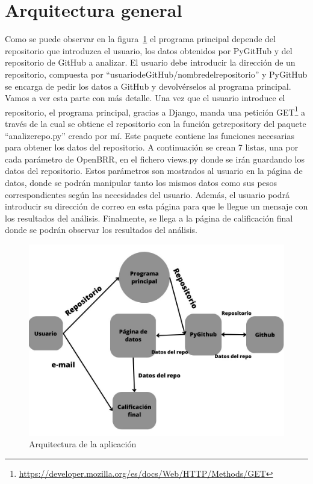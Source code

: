 \documentclass[a4paper, 12pt]{book}
\begin{document}
\section{Arquitectura general} 
\label{sec:arquitectura}
Como se puede observar en la figura~\ref{fig:arquitectura principal} el programa principal depende del repositorio que introduzca el usuario, los datos obtenidos por PyGitHub y del repositorio de GitHub a analizar. El usuario debe introducir la dirección de un repositorio, compuesta por ``usuario\textunderscore de\textunderscore GitHub/nombre\textunderscore del\textunderscore repositorio'' y PyGitHub se encarga de pedir los datos a GitHub y devolvérselos al programa principal. Vamos a ver esta parte con más detalle.
Una vez que el usuario introduce el repositorio, el programa principal, gracias a Django, manda una petición GET\footnote{\url{https://developer.mozilla.org/es/docs/Web/HTTP/Methods/GET}}  a través de la cual se obtiene el repositorio con la función get\textunderscore repository del paquete ``analize\textunderscore repo.py'' creado por mí. Este paquete contiene las funciones necesarias para obtener los datos del repositorio. A continuación se crean 7 listas, una por cada parámetro de OpenBRR, en el fichero views.py donde se irán guardando los datos del repositorio.
Estos parámetros son mostrados al usuario en la página de datos, donde se podrán manipular tanto los mismos datos como sus pesos correspondientes según las necesidades del usuario. Además, el usuario podrá introducir su dirección de correo en esta página para que le llegue un mensaje con los resultados del análisis. Finalmente, se llega a la página de calificación final donde se podrán observar los resultados del análisis.
\begin{figure}
    \centering
    \includegraphics[bb=0 0 800 600, width=12cm, keepaspectratio]{img/programaprincipal.jpg}
    \caption{Arquitectura de la aplicación}\label{fig:arquitectura principal}
\end{figure}
\end{document}
